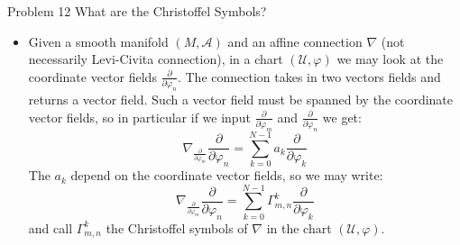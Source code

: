 \documentclass{beamer}
\begin{document}
    \begin{frame}{Problem 12}
        What are the Christoffel Symbols?
        \begin{itemize}
            \item Given a smooth manifold $(M,\mathcal{A})$ and an affine
                connection $\nabla$ (not necessarily Levi-Civita connection),
                in a chart $(\mathcal{U},\varphi)$ we may look at the coordinate
                vector fields $\frac{\partial}{\partial\varphi_{n}}$. The
                connection takes in two vectors fields and returns a vector
                field. Such a vector field must be spanned by the coordinate
                vector fields, so in particular if we input
                $\frac{\partial}{\partial\varphi_{m}}$ and
                $\frac{\partial}{\partial\varphi_{n}}$ we get:
                \begin{equation}
                    \nabla_{\frac{\partial}{\partial\varphi_{m}}}
                        \frac{\partial}{\partial\varphi_{n}}
                    =\sum_{k=0}^{N-1}a_{k}\frac{\partial}{\partial\varphi_{k}}
                \end{equation}
                The $a_{k}$ depend on the coordinate vector fields, so we may
                write:
                \begin{equation}
                    \nabla_{\frac{\partial}{\partial\varphi_{m}}}
                        \frac{\partial}{\partial\varphi_{n}}
                    =\sum_{k=0}^{N-1}\Gamma_{m,n}^{k}
                        \frac{\partial}{\partial\varphi_{k}}
                \end{equation}
                and call $\Gamma_{m,n}^{k}$ the Christoffel symbols of
                $\nabla$ in the chart $(\mathcal{U},\varphi)$.
        \end{itemize}
    \end{frame}
\end{document}
